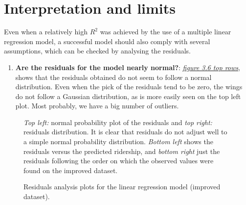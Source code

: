 \documentclass[a4paper,12pt,english]{sphinxmanual}
\begin{document}
\section{Interpretation and limits}
\label{section2:interpretation-and-limits}
Even when a relatively high \(R^2\) was achieved by the use of a multiple
linear regression model, a successful model should also comply with several
assumptions, which can be checked by analysing the residuals.
\begin{enumerate}
\item {} 
\textbf{Are the residuals for the model nearly normal?}:
{\hyperref[section2:figure36]{\emph{figure 3.6 top rows}}}, shows that the residuals obtained do
not seem to follow a normal distribution. Even when the pick of the residuals
tend to be zero, the wings do not follow a Gaussian distribution, as is more
easily seen on the top left plot. Most probably, we have a big number of
outliers.

\end{enumerate}
\begin{figure}[htbp]
\centering
\capstart

\caption{Residuals analysis plots for the linear regression model (improved dataset).}{\small 
\emph{Top left:} normal probability plot of the residuals and \emph{top right:} residuals
distribution. It is clear that residuals do not adjust well to a simple normal
probability distribution. \emph{Bottom left} shows the residuals versus the
predicted ridership, and \emph{bottom right} just the residuals following the order
on which the observed values were found on the improved dataset.
}\label{section2:figure36}\end{figure}
\end{document}
